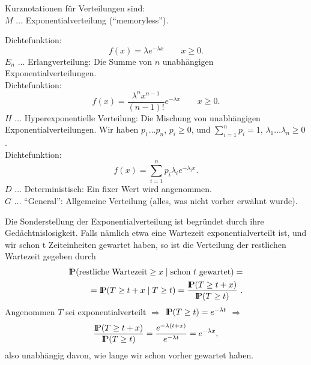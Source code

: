 \begin{minipage}{\textwidth}
Kurznotationen für Verteilungen sind:\\
$M$ $\dots$ Exponentialverteilung (\enquote{memoryless}). \\
\end{minipage}
Dichtefunktion:
\begin{displaymath}
f(x) = \lambda e^{-\lambda x} \qquad x\geq 0.
\end{displaymath}
$E_{n}$ $\dots$ Erlangverteilung: Die Summe von $n$ unabhängigen
Exponentialverteilungen.\\
 Dichtefunktion:
\begin{displaymath}
f(x)=\frac{\lambda^{n}x^{n-1}}{(n-1)!}e^{-\lambda x} \qquad x\geq 0.
\end{displaymath}
$H$ $\dots$ Hyperexponentielle Verteilung: Die Mischung von unabhängigen
Exponentialverteilungen. Wir haben $p_{1} \dots p_{n}$,  $p_{i} \geq 0$,
 und
$\sum_{i=1}^{n} p_{i} = 1$, $\lambda_{1} \dots \lambda_{n} \geq 0$. \\
Dichtefunktion:
\begin{displaymath}
f(x)=\sum_{i=1}^{n} p_{i} \lambda_{i} e^{-\lambda_{i}x}.
\end{displaymath}
$D$ $\dots$ Deterministisch: Ein fixer Wert wird angenommen. \\
$G$ $\dots$ \enquote{General}: Allgemeine Verteilung (alles, was nicht vorher erwähnt
wurde).

Die Sonderstellung der Exponentialverteilung ist begründet durch ihre
Gedächtnislosigkeit. Falls nämlich etwa eine Wartezeit
exponentialverteilt ist, und wir schon t Zeiteinheiten gewartet haben, so
ist die Verteilung der restlichen Wartezeit gegeben durch
\begin{eqnarray*}
{\rm I\kern-0.2em P}(\mbox{restliche Wartezeit} \geq x \mid \mbox{schon $t$
gewartet}) = \\
= {\rm I\kern-0.2em P}(T \geq t+x \mid T \geq t) = \frac{{\rm I\kern-0.2em P}(T \geq t+x)}{{\rm I\kern-0.2em P}(T\geq t)} ~.
\end{eqnarray*}
Angenommen $T$  sei exponentialverteilt $\Rightarrow$ ${\rm I\kern-0.2em P}(T \geq t) =
e^{-\lambda t}$  $\Rightarrow$
\begin{displaymath}
\frac{{\rm I\kern-0.2em P}(T \geq t+x)}{{\rm I\kern-0.2em P}(T \geq t)} = \frac{e^{-\lambda
(t+x)}}{e^{-\lambda
t}}= e^{-\lambda x},
\end{displaymath}
also unabhängig davon, wie lange wir schon vorher gewartet haben.

